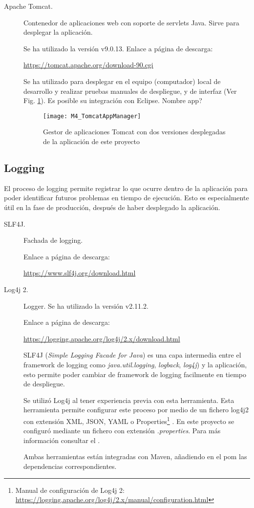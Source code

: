 \begin{description}
	\item[Apache Tomcat.] Contenedor de aplicaciones web con soporte de servlets Java. Sirve para desplegar la aplicación.
	
		Se ha utilizado la versión  v9.0.13. Enlace a página de descarga:
		
		\url{https://tomcat.apache.org/download-90.cgi}
		
		Se ha utilizado para desplegar en el equipo (computador) local de desarrollo y realizar pruebas manuales de despliegue, y de interfaz (Ver Fig. \ref{fig:M4_TomcatAppManager}). Es posible su integración con Eclipse. \todo Nombre app?
		
		\begin{figure}[!h]
			\centering
			\texttt{[image: M4\_TomcatAppManager]}
			\caption{Gestor de aplicaciones Tomcat con dos versiones desplegadas de la aplicación de este proyecto}\label{fig:M4_TomcatAppManager}
		\end{figure}
		\FloatBarrier
		
\end{description}
\subsection{Logging}
El proceso de logging permite registrar lo que ocurre dentro de la aplicación para poder identificar futuros problemas en tiempo de ejecución. Esto es especialmente útil en la fase de producción, después de haber desplegado la aplicación.
\begin{description}
	\item[SLF4J.] Fachada de logging.
	
		Enlace a página de descarga:
	
		\url{https://www.slf4j.org/download.html}
	
	\item[Log4j 2.] Logger. Se ha utilizado la versión  v2.11.2.
	
	 	Enlace a página de descarga:
	
	 	\url{https://logging.apache.org/log4j/2.x/download.html}
	
		SLF4J (\textit{Simple Logging Facade for Java}) es una capa intermedia entre el framework de logging como \textit{java.util.logging}, \textit{logback}, \textit{log4j}) y la aplicación, esto permite poder cambiar de framework de logging facilmente en tiempo de despliegue.
		
		Se utilizó Log4j al tener experiencia previa con esta herramienta. Esta herramienta permite configurar este proceso por medio de un fichero log4j2 con extensión XML, JSON, YAML o Properties\footnote{Manual de configuración de Log4j 2: \url{https://logging.apache.org/log4j/2.x/manual/configuration.html}} \cite{noauthor_log4j_nodate}. En este proyecto se configuró mediante un fichero con extensión \textit{.properties}. Para más información consultar el . 
		
		Ambas herramientas están integradas con Maven, añadiendo en el pom las dependencias correspondientes.
	
\end{description}
